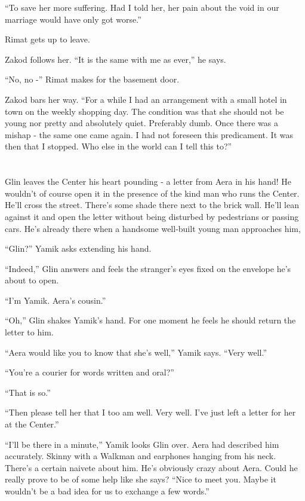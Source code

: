 \documentclass[twoside,11pt]{book}
\begin{document}
``To save her more suffering. Had I told her, her pain about the void in our marriage would have only
got worse.''

Rimat gets up to leave.

Zakod follows her. ``It is the same with me as ever,'' he says.

``No, no -'' Rimat makes for the basement door.

Zakod bars her way. ``For a while I had an arrangement with a small hotel in town on the weekly shopping
day. The condition was that she should not be young nor pretty and absolutely quiet. Preferably dumb.  Once there was a
mishap - the same one came again. I had not foreseen this predicament. It was then that I stopped. Who else in the
world can I tell this to?''



\chapter{}

Glin leaves the Center his heart pounding - a letter from Aera in his hand! He wouldn't of course open it in the
presence of the kind man who runs the Center. He'll cross the street. There's some shade there next to the brick wall.
He'll lean against it and open the letter without being disturbed by pedestrians or passing cars. He's already there
when a handsome well-built young man approaches him,

``Glin?'' Yamik asks extending his hand.

``Indeed,'' Glin answers and feels the stranger's eyes fixed on the envelope he's about to
open.

``I'm Yamik. Aera's cousin.''

``Oh,'' Glin shakes Yamik's hand. For one moment he feels he should return the letter to him.


``Aera would like you to know that she's well,'' Yamik says. ``Very
well.''

``You're a courier for words written and oral?''

``That is so.''

``Then please tell her that I too am well. Very well.  I've just left a letter for her at the
Center.''

``I'll be there in a minute,'' Yamik looks Glin over. Aera had described him accurately.
Skinny with a Walkman and earphones hanging from his neck. There's a certain naivete about him. He's obviously crazy
about Aera. Could he really prove to be of some help like she says? ``Nice to meet you. Maybe it wouldn't
be a bad idea for us to exchange a few words.''
\end{document}
